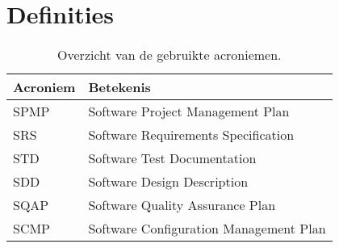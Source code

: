 \chapter{Definities}
\begin{table} [H]
    \centering
    \caption{Overzicht van de gebruikte acroniemen.}
\begin{tabular}{l|l}
    Acroniem & Betekenis \\
    \hline
    SPMP & Software Project Management Plan \\
    SRS & Software Requirements Specification \\
    STD & Software Test Documentation \\
    SDD & Software Design Description \\
    SQAP & Software Quality Assurance Plan \\
    SCMP & Software Configuration Management Plan
\end{tabular}
\end{table}